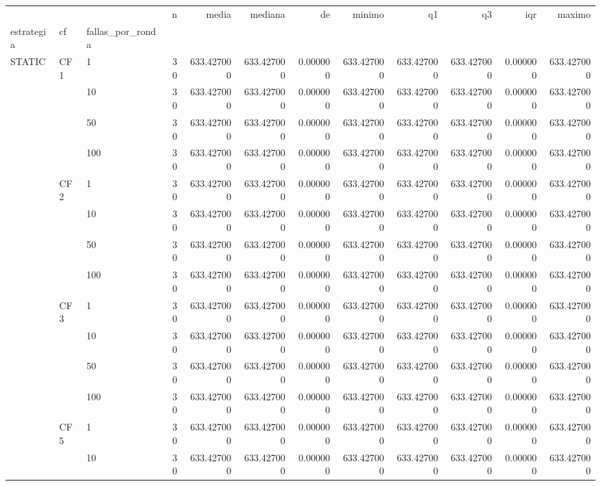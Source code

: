 \begin{tabular}{lllrrrrrrrrr}
\toprule
 &  &  & n & media & mediana & de & minimo & q1 & q3 & iqr & maximo \\
estrategia & cf & fallas_por_ronda &  &  &  &  &  &  &  &  &  \\
\midrule
\multirow[t]{16}{*}{STATIC} & \multirow[t]{4}{*}{CF1} & 1 & 30 & 633.427000 & 633.427000 & 0.000000 & 633.427000 & 633.427000 & 633.427000 & 0.000000 & 633.427000 \\
 &  & 10 & 30 & 633.427000 & 633.427000 & 0.000000 & 633.427000 & 633.427000 & 633.427000 & 0.000000 & 633.427000 \\
 &  & 50 & 30 & 633.427000 & 633.427000 & 0.000000 & 633.427000 & 633.427000 & 633.427000 & 0.000000 & 633.427000 \\
 &  & 100 & 30 & 633.427000 & 633.427000 & 0.000000 & 633.427000 & 633.427000 & 633.427000 & 0.000000 & 633.427000 \\
\cline{2-12}
 & \multirow[t]{4}{*}{CF2} & 1 & 30 & 633.427000 & 633.427000 & 0.000000 & 633.427000 & 633.427000 & 633.427000 & 0.000000 & 633.427000 \\
 &  & 10 & 30 & 633.427000 & 633.427000 & 0.000000 & 633.427000 & 633.427000 & 633.427000 & 0.000000 & 633.427000 \\
 &  & 50 & 30 & 633.427000 & 633.427000 & 0.000000 & 633.427000 & 633.427000 & 633.427000 & 0.000000 & 633.427000 \\
 &  & 100 & 30 & 633.427000 & 633.427000 & 0.000000 & 633.427000 & 633.427000 & 633.427000 & 0.000000 & 633.427000 \\
\cline{2-12}
 & \multirow[t]{4}{*}{CF3} & 1 & 30 & 633.427000 & 633.427000 & 0.000000 & 633.427000 & 633.427000 & 633.427000 & 0.000000 & 633.427000 \\
 &  & 10 & 30 & 633.427000 & 633.427000 & 0.000000 & 633.427000 & 633.427000 & 633.427000 & 0.000000 & 633.427000 \\
 &  & 50 & 30 & 633.427000 & 633.427000 & 0.000000 & 633.427000 & 633.427000 & 633.427000 & 0.000000 & 633.427000 \\
 &  & 100 & 30 & 633.427000 & 633.427000 & 0.000000 & 633.427000 & 633.427000 & 633.427000 & 0.000000 & 633.427000 \\
\cline{2-12}
 & \multirow[t]{4}{*}{CF5} & 1 & 30 & 633.427000 & 633.427000 & 0.000000 & 633.427000 & 633.427000 & 633.427000 & 0.000000 & 633.427000 \\
 &  & 10 & 30 & 633.427000 & 633.427000 & 0.000000 & 633.427000 & 633.427000 & 633.427000 & 0.000000 & 633.427000 \\

\end{tabular}
